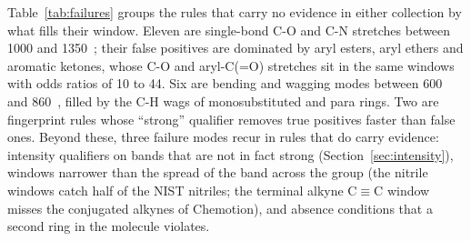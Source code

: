 Table~\ref{tab:failures} groups the rules that carry no evidence in either collection by what fills their window. Eleven are single-bond C-O and C-N stretches between 1000 and 1350~\wn{}; their false positives are dominated by aryl esters, aryl ethers and aromatic ketones, whose C-O and aryl-C(=O) stretches sit in the same windows with odds ratios of 10 to 44. Six are bending and wagging modes between 600 and 860~\wn{}, filled by the C-H wags of monosubstituted and para rings. Two are fingerprint rules whose ``strong'' qualifier removes true positives faster than false ones. Beyond these, three failure modes recur in rules that do carry evidence: intensity qualifiers on bands that are not in fact strong (Section~\ref{sec:intensity}), windows narrower than the spread of the band across the group (the nitrile windows catch half of the NIST nitriles; the terminal alkyne C$\equiv$C window misses the conjugated alkynes of Chemotion), and absence conditions that a second ring in the molecule violates.

